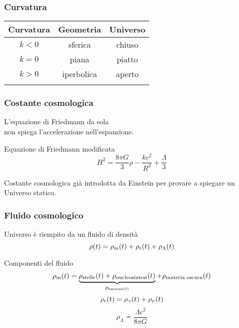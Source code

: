 \begin{frame}
  \frametitle{Curvatura}
  \begin{table}
    \centering
    \begin{tabular}{ccc}
      \toprule{}
      Curvatura & Geometria & Universo \\
      \midrule{}
      $k < 0$ & sferica & chiuso \\
      $k = 0$ & piana & piatto \\
      $k > 0$ & iperbolica & aperto \\
      \bottomrule{}
    \end{tabular}
  \end{table}
\end{frame}

\begin{frame}
  \frametitle{Costante cosmologica}
  L'equazione di Friedmann da sola \\
  non spiega l'accelerazione nell'espansione.
  \begin{block}{Equazione di Friedmann modificata}
    \begin{equation*}
      H^2 = \frac{8\pi G}{3}\rho - \frac{kc^2}{R^2} + \frac{\Lambda}{3}
    \end{equation*}
  \end{block}
  Costante cosmologica già introdotta da Einstein per provare a spiegare un
  Universo statico.
\end{frame}

\begin{frame}
  \frametitle{Fluido cosmologico}
  Universo è riempito da un fluido di densità
  \begin{equation*}
    \rho(t) = \rho_{\textup{m}}(t) + \rho_{\textup{r}}(t) + \rho_\Lambda(t)
  \end{equation*}
  \pause{}
  \begin{block}{Componenti del fluido}
    \begin{equation*}
      \rho_{\textup{m}}(t) =
      \underbrace{\rho_{\textup{stelle}}(t) +
        \rho_{\textup{nucleosintesi}}(t)}_{\rho_{\textup{barioni}(t)}} +
      \rho_{\textup{materia oscura}}(t)
    \end{equation*}
    \pause{}
    \begin{equation*}
      \rho_{\textup{r}}(t) = \rho_\gamma(t) + \rho_\nu(t)
    \end{equation*}
    \pause{}
    \begin{equation*}
      \rho_\Lambda = \frac{\Lambda c^2}{8\pi G}
    \end{equation*}
  \end{block}
\end{frame}

